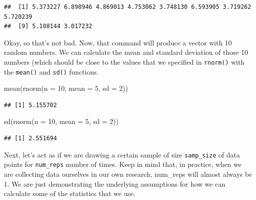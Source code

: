\documentclass[
]{book}
\newenvironment{Shaded}{\begin{snugshade}}{\end{snugshade}}
\newcommand{\AttributeTok}[1]{\textcolor[rgb]{0.77,0.63,0.00}{#1}}
\newcommand{\DecValTok}[1]{\textcolor[rgb]{0.00,0.00,0.81}{#1}}
\newcommand{\FunctionTok}[1]{\textcolor[rgb]{0.00,0.00,0.00}{#1}}
\newcommand{\NormalTok}[1]{#1}
\begin{document}
\begin{verbatim}
##  [1] 5.373227 6.898946 4.869013 4.753062 3.748130 6.593905 3.719262 5.720239
##  [9] 5.108144 3.017232
\end{verbatim}

Okay, so that's not bad. Now, that command will produce a vector with 10 random numbers. We can calculate the mean and standard deviation of those 10 numbers (which should be close to the values that we specified in \texttt{rnorm()} with the \texttt{mean()} and \texttt{sd()} functions.

\begin{Shaded}
\begin{Highlighting}[]
\FunctionTok{mean}\NormalTok{(}\FunctionTok{rnorm}\NormalTok{(}\AttributeTok{n =} \DecValTok{10}\NormalTok{, }\AttributeTok{mean =} \DecValTok{5}\NormalTok{, }\AttributeTok{sd =} \DecValTok{2}\NormalTok{))}
\end{Highlighting}
\end{Shaded}

\begin{verbatim}
## [1] 5.155702
\end{verbatim}

\begin{Shaded}
\begin{Highlighting}[]
\FunctionTok{sd}\NormalTok{(}\FunctionTok{rnorm}\NormalTok{(}\AttributeTok{n =} \DecValTok{10}\NormalTok{, }\AttributeTok{mean =} \DecValTok{5}\NormalTok{, }\AttributeTok{sd =} \DecValTok{2}\NormalTok{))}
\end{Highlighting}
\end{Shaded}

\begin{verbatim}
## [1] 2.551694
\end{verbatim}

Next, let's act as if we are drawing a certain sample of size \texttt{samp\_size} of data points for \texttt{num\_reps} number of times. Keep in mind that, in practice, when we are collecting data ourselves in our own research, num\_reps will almost always be 1. We are just demonstrating the underlying assumptions for how we can calculate some of the statistics that we use.
\end{document}
